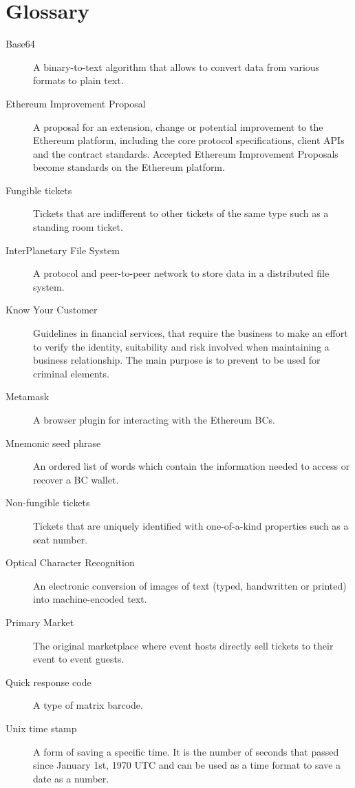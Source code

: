 \chapter*{Glossary}

\begin{description}
  \item[Base64] A binary-to-text algorithm that allows to convert data from various formats to plain text.
  \item[Ethereum Improvement Proposal] A proposal for an extension, change or potential improvement to the Ethereum platform, including the core protocol specifications, client APIs and the contract standards. Accepted Ethereum Improvement Proposals become standards on the Ethereum platform.
  \item[Fungible tickets] Tickets that are indifferent to other tickets of the same type such as a standing room ticket.
  \item[InterPlanetary File System] A protocol and peer-to-peer network to store data in a distributed file system.
  \item[Know Your Customer] Guidelines in financial services, that require the business to make an effort to verify the identity, suitability and risk involved when maintaining a business relationship. The main purpose is to prevent to be used for criminal elements.
  \item[Metamask] A browser plugin for interacting with the Ethereum BCs.
  \item[Mnemonic seed phrase] An ordered list of words which contain the information needed to access or recover a BC wallet.
  \item[Non-fungible tickets] Tickets that are uniquely identified with one-of-a-kind properties such as a seat number.
  \item[Optical Character Recognition] An electronic conversion of images of text (typed, handwritten or printed) into machine-encoded text.
  \item[Primary Market] The original marketplace where event hosts directly sell tickets to their event to event guests.
  \item[Quick response code] A type of matrix barcode.
  \item[Unix time stamp] A form of saving a specific time. It is the number of seconds that passed since January 1st, 1970 UTC and can be used as a time format to save a date as a number.
\end{description}
